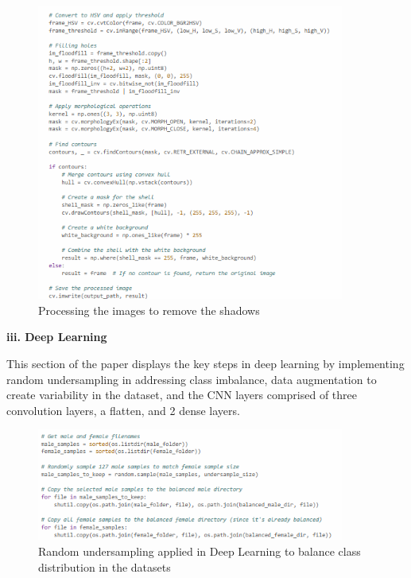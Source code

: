 \begin{figure}[!htbp]
	\centering
	\includegraphics[width=0.9\textwidth, angle=0]{figures/shadow_remove.png}
	\caption{Processing the images to remove the shadows}
\end{figure}

\newpage

\noindent\textbf{iii. Deep Learning}
\vspace{-0.5cm}

This section of the paper displays the key steps in deep learning by implementing random undersampling in addressing class imbalance, data augmentation to create variability in the dataset, and the CNN layers comprised of three convolution layers, a flatten, and 2 dense layers. 


\begin{figure}[!htbp]
	\centering
	\includegraphics[width=0.9\textwidth, angle=0]{figures/random_undersampling_DL.png}
	\caption{Random undersampling applied in Deep Learning to balance class distribution in the datasets}
\end{figure}

